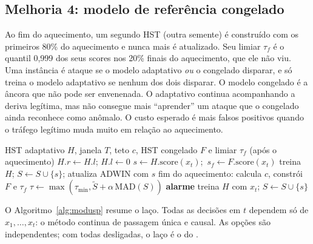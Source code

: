 \subsection{Melhoria 4: modelo de referência congelado}
Ao fim do aquecimento, um segundo HST (outra semente) é construído com os primeiros 80\% do
aquecimento e nunca mais é atualizado. Seu limiar $\tau_f$ é o quantil 0,999 dos seus scores nos
20\% finais do aquecimento, que ele não viu. Uma instância é ataque se o modelo adaptativo
\emph{ou} o congelado disparar, e só treina o modelo adaptativo se nenhum dos dois disparar.
O modelo congelado é a âncora que não pode ser envenenada. O adaptativo continua acompanhando a
deriva legítima, mas não consegue mais ``aprender'' um ataque que o congelado ainda reconhece como
anômalo. O custo esperado é mais falsos positivos quando o tráfego legítimo muda muito em relação
ao aquecimento.

\begin{algorithm}[t]
\caption{Laço do \modusp\ (por instância $x_t$, no instante $\mathit{ts}_t$)}
\label{alg:modusp}
\begin{algorithmic}[1]
\small
\Require HST adaptativo $H$, janela $T$, teto $c$, HST congelado $F$ e limiar $\tau_f$ (após o aquecimento)
 \State $H.r \gets H.l$; $H.l \gets 0$ \EndIf
\State $s \gets H.\mathrm{score}(x_t)$;\ $s_f \gets F.\mathrm{score}(x_t)$
 \State treina $H$; $S \gets S \cup \{s\}$; atualiza ADWIN com $s$
   \State fim do aquecimento: calcula $c$, constrói $F$ e $\tau_f$ \EndIf
\Else
  \State $\tau \gets \max(\tau_{\min}, \tilde{S} + \alpha\,\mathrm{MAD}(S))$
   \State \textbf{alarme} 
   \State treina $H$ com $x_t$; $S \gets S \cup \{s\}$
  \EndIf
\EndIf
\end{algorithmic}
\end{algorithm}

O Algoritmo~\ref{alg:modusp} resume o laço. Todas as decisões em $t$ dependem só de
$x_1,\dots,x_t$: o método continua de passagem única e causal. As opções são independentes; com
todas desligadas, o laço é o do \modus.
